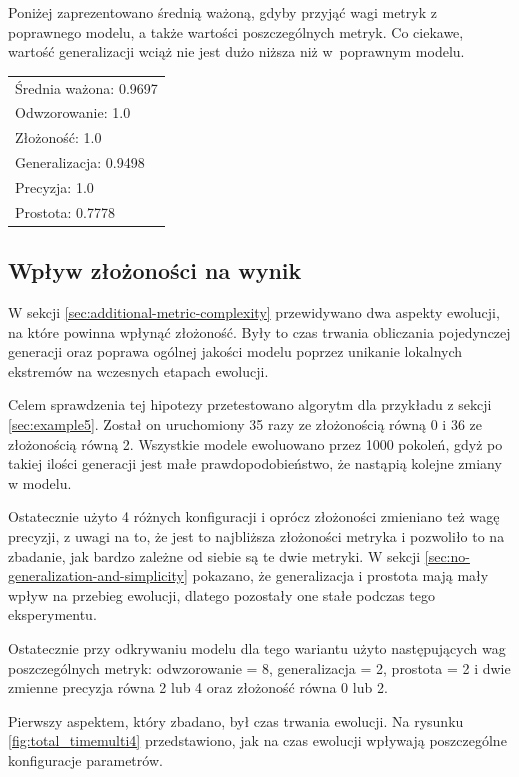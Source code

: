 Poniżej zaprezentowano średnią ważoną, gdyby przyjąć wagi metryk z poprawnego modelu, a także wartości poszczególnych metryk. Co ciekawe, wartość generalizacji wciąż nie jest dużo niższa niż w~poprawnym modelu.
 
 \begin{center}
  \begin{tabular}{l}
	Średnia ważona: 0.9697 \\
	Odwzorowanie: 1.0 \\
	Złożoność: 1.0 \\
	Generalizacja: 0.9498 \\
	Precyzja: 1.0 \\
	Prostota: 0.7778
  \end{tabular}
 \end{center}

\subsection{Wpływ złożoności na wynik}
W sekcji \ref{sec:additional-metric-complexity} przewidywano dwa aspekty ewolucji, na które powinna wpłynąć złożoność. Były to czas trwania obliczania pojedynczej generacji oraz poprawa ogólnej jakości modelu poprzez unikanie lokalnych ekstremów na wczesnych etapach ewolucji. 

Celem sprawdzenia tej hipotezy przetestowano algorytm dla przykładu z sekcji \ref{sec:example5}. Został on  uruchomiony 35 razy ze złożonością równą 0 i 36 ze złożonością równą 2. Wszystkie modele ewoluowano przez 1000 pokoleń, gdyż po takiej ilości generacji jest małe prawdopodobieństwo, że nastąpią kolejne zmiany w modelu. 

Ostatecznie użyto 4 różnych konfiguracji i oprócz złożoności zmieniano też wagę precyzji, z uwagi na to, że jest to najbliższa złożoności metryka i pozwoliło to na zbadanie, jak bardzo zależne od siebie są te dwie metryki. W sekcji \ref{sec:no-generalization-and-simplicity} pokazano, że generalizacja i prostota mają mały wpływ na przebieg ewolucji, dlatego pozostały one stałe podczas tego eksperymentu.

Ostatecznie przy odkrywaniu modelu dla tego wariantu użyto następujących wag poszczególnych metryk: odwzorowanie = 8, generalizacja = 2, prostota = 2 i dwie zmienne precyzja równa 2 lub 4 oraz złożoność równa 0 lub 2. 

Pierwszy aspektem, który zbadano, był czas trwania ewolucji. Na rysunku \ref{fig:total_timemulti4} przedstawiono, jak na czas ewolucji wpływają poszczególne konfiguracje parametrów.  

